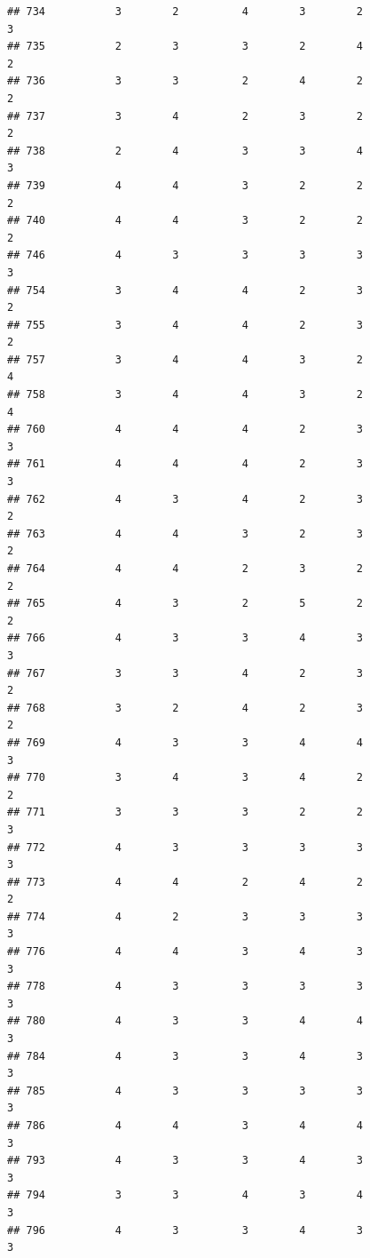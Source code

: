 \documentclass[
]{article}
\begin{document}
\begin{verbatim}
## 734           3        2          4        3        2               3
## 735           2        3          3        2        4               2
## 736           3        3          2        4        2               2
## 737           3        4          2        3        2               2
## 738           2        4          3        3        4               3
## 739           4        4          3        2        2               2
## 740           4        4          3        2        2               2
## 746           4        3          3        3        3               3
## 754           3        4          4        2        3               2
## 755           3        4          4        2        3               2
## 757           3        4          4        3        2               4
## 758           3        4          4        3        2               4
## 760           4        4          4        2        3               3
## 761           4        4          4        2        3               3
## 762           4        3          4        2        3               2
## 763           4        4          3        2        3               2
## 764           4        4          2        3        2               2
## 765           4        3          2        5        2               2
## 766           4        3          3        4        3               3
## 767           3        3          4        2        3               2
## 768           3        2          4        2        3               2
## 769           4        3          3        4        4               3
## 770           3        4          3        4        2               2
## 771           3        3          3        2        2               3
## 772           4        3          3        3        3               3
## 773           4        4          2        4        2               2
## 774           4        2          3        3        3               3
## 776           4        4          3        4        3               3
## 778           4        3          3        3        3               3
## 780           4        3          3        4        4               3
## 784           4        3          3        4        3               3
## 785           4        3          3        3        3               3
## 786           4        4          3        4        4               3
## 793           4        3          3        4        3               3
## 794           3        3          4        3        4               3
## 796           4        3          3        4        3               3

\end{verbatim}
\end{document}

